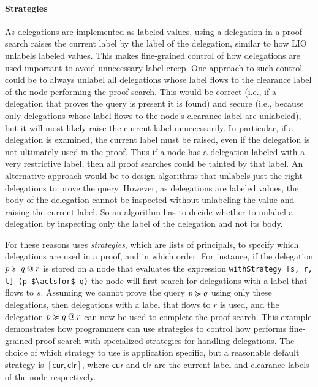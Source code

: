 \paragraph{Strategies}
As delegations are implemented as labeled values, using a delegation in a proof search raises the current label by the label of the delegation, similar to how LIO unlabels labeled values. This makes fine-grained control of how delegations are used important to avoid unnecessary label creep. One approach to such control could be to always unlabel all delegations whose label flows to the clearance label of the node performing the proof search. This would be correct (i.e., if a delegation that proves the query is present it is found) and secure (i.e., because only delegations whose label flows to the node's clearance label are unlabeled), but it will most likely raise the current label unnecessarily. In particular, if a delegation is examined, the current label must be raised, even if the delegation is not ultimately used in the proof. Thus if a node has a delegation labeled with a very restrictive label, then all proof searches could be tainted by that label.
An alternative approach would be to design algorithms that unlabels just the right delegations to prove the query. However, as delegations are labeled values, the body of the delegation cannot be inspected without unlabeling the value and raising the current label. So an algorithm has to decide whether to unlabel a delegation by inspecting only the label of the delegation and not its body.

For these reasons \lang{} uses \emph{strategies}, which are lists of principals, to specify which delegations are used in a proof, and in which order. For instance, if the delegation $\lb{r}{p \actsfor q}$ is stored on a node that evaluates the expression \lstinline[mathescape]!withStrategy [s, r, t] (p $\actsfor$ q)! the node will first search for delegations with a label that flows to $s$. Assuming we cannot prove the query $p \actsfor q$ using only these delegations, then delegations with a label that flows to $r$ is used, and the delegation $\lb{r}{p \actsfor q}$ can now be used to complete the proof search. This example demonstrates how programmers can use strategies to control how \lang{} performs fine-grained proof search with specialized strategies for handling delegations. The choice of which strategy to use is application specific, but a reasonable default strategy is $[\mathsf{cur}, \mathsf{clr}]$, where $\mathsf{cur}$ and $\mathsf{clr}$ are the current label and clearance labels of the node respectively.

